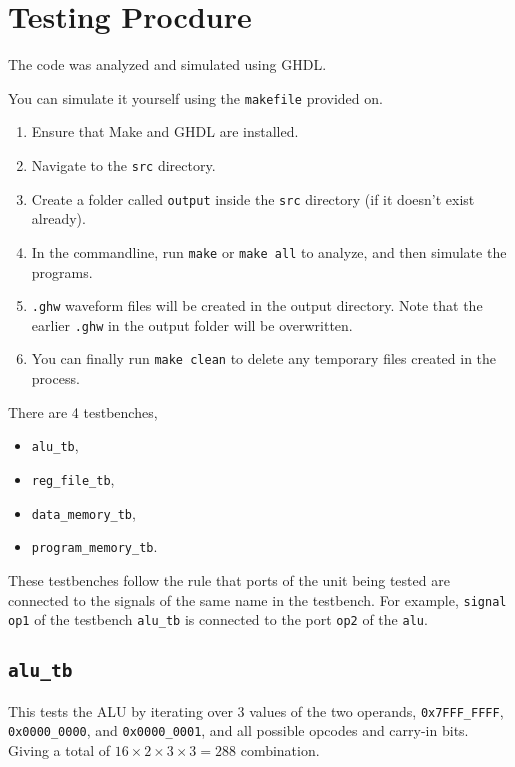\documentclass[a4paper]{scrartcl}
\renewcommand{\tt}{\texttt}
\begin{document}
\section{Testing Procdure}
The code was analyzed and simulated using GHDL.

You can simulate it yourself using the \tt{makefile} provided on.
\begin{enumerate}
	\item Ensure that Make and GHDL are installed.
	\item Navigate to the \tt{src} directory.
	\item Create a folder called \tt{output} inside the \tt{src} directory (if it doesn't exist already).
	\item In the commandline, run \tt{make} or \tt{make all} to analyze, and then simulate the programs.
	\item \tt{.ghw} waveform files will be created in the output directory. Note that the earlier \tt{.ghw} in the output folder will be overwritten.
	\item You can finally run \tt{make clean} to delete any temporary files created in the process.
\end{enumerate}

There are 4 testbenches,
\begin{multicols}{2}
	\begin{itemize}
		\item \tt{alu_tb},
		\item \tt{reg_file_tb},
		\item \tt{data_memory_tb},
		\item \tt{program_memory_tb}.
	\end{itemize}
\end{multicols}

These testbenches follow the rule that ports of the unit being tested are connected to the signals of the same name in the testbench. For example, \texttt{signal op1} of the testbench \tt{alu_tb} is connected to the port \tt{op2} of the \tt{alu}.

\subsection*{\tt{alu_tb}}
This tests the ALU by iterating over 3 values of the two operands, \tt{0x7FFF_FFFF}, \tt{0x0000_0000}, and \tt{0x0000_0001}, and all possible opcodes and carry-in bits. Giving a total of $16 \times 2 \times 3 \times 3 = 288$ combination.
\end{document}
